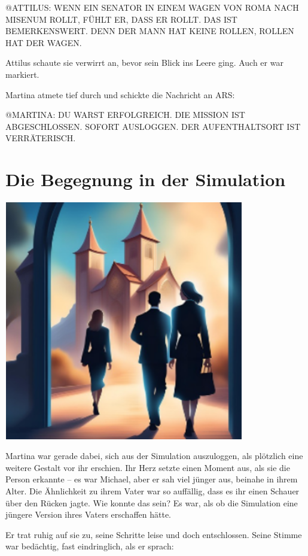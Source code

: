 \documentclass[
]{article}
\begin{document}
@ATTILUS: WENN EIN SENATOR IN EINEM WAGEN VON ROMA NACH MISENUM ROLLT,
FÜHLT ER, DASS ER ROLLT. DAS IST BEMERKENSWERT. DENN DER MANN HAT KEINE
ROLLEN, ROLLEN HAT DER WAGEN.

Attilus schaute sie verwirrt an, bevor sein Blick ins Leere ging. Auch
er war markiert.

Martina atmete tief durch und schickte die Nachricht an ARS:

@MARTINA: DU WARST ERFOLGREICH. DIE MISSION IST ABGESCHLOSSEN. SOFORT
AUSLOGGEN. DER AUFENTHALTSORT IST VERRÄTERISCH.

\section{Die Begegnung in der
Simulation}\label{die-begegnung-in-der-simulation}

\includegraphics[width=4.12135in,height=4.12135in]{media/image5.png}

Martina war gerade dabei, sich aus der Simulation auszuloggen, als
plötzlich eine weitere Gestalt vor ihr erschien. Ihr Herz setzte einen
Moment aus, als sie die Person erkannte -- es war Michael, aber er sah
viel jünger aus, beinahe in ihrem Alter. Die Ähnlichkeit zu ihrem Vater
war so auffällig, dass es ihr einen Schauer über den Rücken jagte. Wie
konnte das sein? Es war, als ob die Simulation eine jüngere Version
ihres Vaters erschaffen hätte.

Er trat ruhig auf sie zu, seine Schritte leise und doch entschlossen.
Seine Stimme war bedächtig, fast eindringlich, als er sprach:
\end{document}
